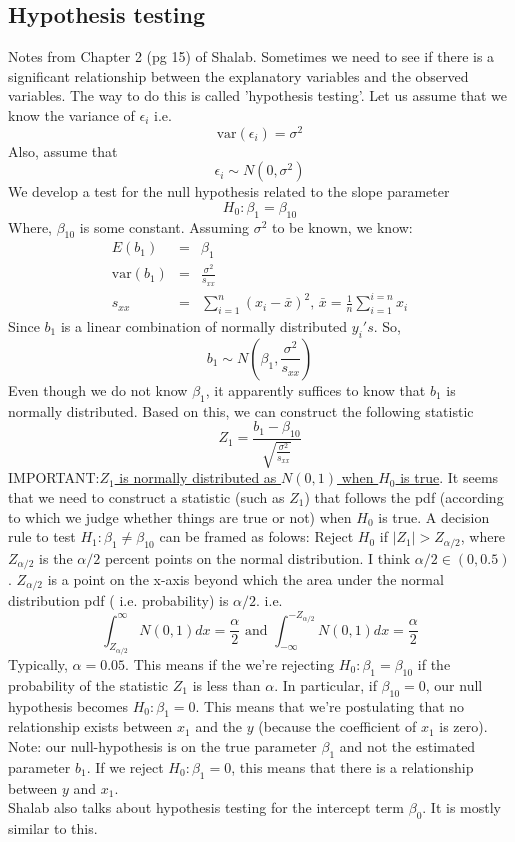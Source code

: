 \documentclass{article}
\newcommand{\beq}{\begin{equation}}
\newcommand{\eeq}{\end{equation}}
\newcommand{\ber}{\begin{eqnarray}}
\newcommand{\eer}{\end{eqnarray}}
\begin{document}
\subsection{Hypothesis testing}
Notes from Chapter 2 (pg 15) of Shalab. Sometimes we need to see if there is a significant relationship between the explanatory variables and the observed variables. The way to do this is called 'hypothesis testing'. Let us assume that we know the variance of $\epsilon_i$ i.e.
\beq
\text{var}(\epsilon_i) = \sigma^2
\eeq
Also, assume that
\beq
\epsilon_i \sim N(0,\sigma^2)
\eeq
We develop a test for the null hypothesis related to the slope parameter
\beq
H_0:\beta_1 = \beta_{10}
\eeq
Where, $\beta_{10}$ is some constant. Assuming $\sigma^2$ to be known, we know:
\ber
E(b_1)&=&\beta_1 \\
\text{var}(b_1) &=& \frac{\sigma^2}{s_{xx}}\\
s_{xx} &=& \sum_{i=1}^{n}(x_i - \bar{x})^2,\,\bar{x} = \frac{1}{n}\sum_{i=1}^{i=n}x_i
\eer
Since $b_1$ is a linear combination of normally distributed $y_i's$. So,
\beq
b_1 \sim N(\beta_1,\frac{\sigma^2}{s_{xx}})  
\eeq
Even though we do not know $\beta_1$, it apparently suffices to know that $b_1$ is normally distributed. Based on this, we can construct the following statistic
\beq
Z_1 = \frac{b_1-\beta_{10}}{\sqrt{\frac{\sigma^2}{s_{xx}}}}
\eeq
IMPORTANT:\underline{$Z_1$ is normally distributed as $N(0,1)$ when $H_0$ is true}. It seems that we need to construct a statistic (such as $Z_1$) that follows the pdf (according to which we judge whether things are true or not) when $H_0$ is true. A decision rule to test $H_1:\beta_1 \neq \beta_{10}$ can be framed as folows:
Reject $H_0$ if $|Z_1| > Z_{\alpha/2}$, where $Z_{\alpha/2}$ is the $\alpha/2$ percent points on the normal distribution. I think $\alpha/2 \in(0,0.5)$. $Z_{\alpha/2}$ is a point on the x-axis beyond which the area under the normal distribution pdf ( i.e. probability) is $\alpha/2$. i.e.
\beq
\int_{Z_{\alpha/2}}^{\infty}N(0,1)dx = \frac{\alpha}{2} \text{ and } \int_{-\infty}^{-Z_{\alpha/2}}N(0,1)dx = \frac{\alpha}{2}
\eeq
Typically, $\alpha = 0.05$. This means if the we're rejecting $H_0:\beta_1 = \beta_{10}$ if the probability of the statistic $Z_1$ is less than $\alpha$. In particular, if $\beta_{10}=0$, our null hypothesis becomes $H_0:\beta_1 = 0$. This means that we're postulating that no relationship exists between $x_1$ and the $y$ (because the coefficient of $x_1$ is zero). Note: our null-hypothesis is on the true parameter $\beta_1$ and not the estimated parameter $b_1$. If we reject  $H_0:\beta_1 = 0$, this means that there is a relationship between $y$ and $x_1$.\\
Shalab also talks about hypothesis testing for the intercept term $\beta_0$. It is mostly similar to this.
\end{document}
